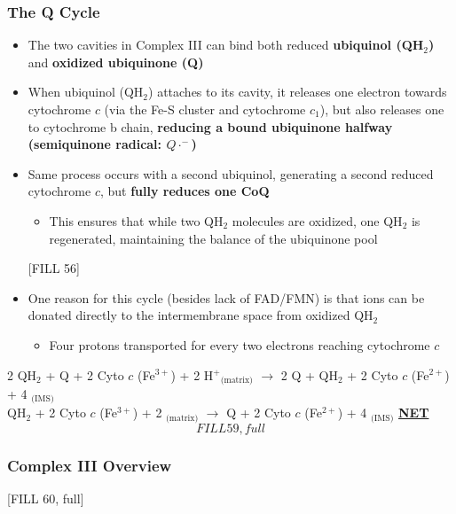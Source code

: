 \documentclass[10pt]{article}
\newcommand{\proton}{\text{H$^+$}}
\newcommand{\pc}{$^+$}
\begin{document}
\subsubsection*{The Q Cycle}
\begin{itemize}
	\item The two cavities in Complex III can bind both reduced \textbf{ubiquinol (QH$_2$)} and \textbf{oxidized ubiquinone (Q)}
	\item When ubiquinol (QH$_2$) attaches to its cavity, it releases one electron towards cytochrome $c$ (via the Fe-S cluster and cytochrome $c_1$), but also releases one to cytochrome b chain, \textbf{reducing a bound ubiquinone halfway (semiquinone radical: $Q \cdot^-$)}
	\item Same process occurs with a second ubiquinol, generating a second reduced cytochrome $c$, but \textbf{fully reduces one CoQ}
	\begin{itemize}
        \item This ensures that while two QH$_2$ molecules are oxidized, one QH$_2$ is regenerated, maintaining the balance of the ubiquinone pool
    \end{itemize}
    \begin{center} 
        [FILL 56]
    \end{center}
    \item One reason for this cycle (besides lack of FAD/FMN) is that \proton ions can be donated directly to the intermembrane space from oxidized QH$_2$
    \begin{itemize}
        \item Four protons transported for every two electrons reaching cytochrome $c$
    \end{itemize}
\end{itemize}
\begin{center} 
	2 QH$_2$ + Q + 2 Cyto $c$ (Fe$^{3+}$) + 2 H\pc$_{\text{(matrix)}}$ $\rightarrow$ 2 Q + QH$_2$ + 2 Cyto $c$ (Fe$^{2+}$) + 4 \proton$_{\text{(IMS)}}$\\
    QH$_2$ + 2 Cyto $c$ (Fe$^{3+}$) + 2 \proton$_{\text{(matrix)}}$ $\rightarrow$ Q + 2 Cyto $c$ (Fe$^{2+}$) + 4 \proton$_{\text{(IMS)}}$ \hspace{1cm} \textbf{\underline{NET}}\\
    \[FILL 59, full\]
\end{center}

\subsubsection*{Complex III Overview}
\begin{center} 
	[FILL 60, full]
\end{center}
\end{document}
